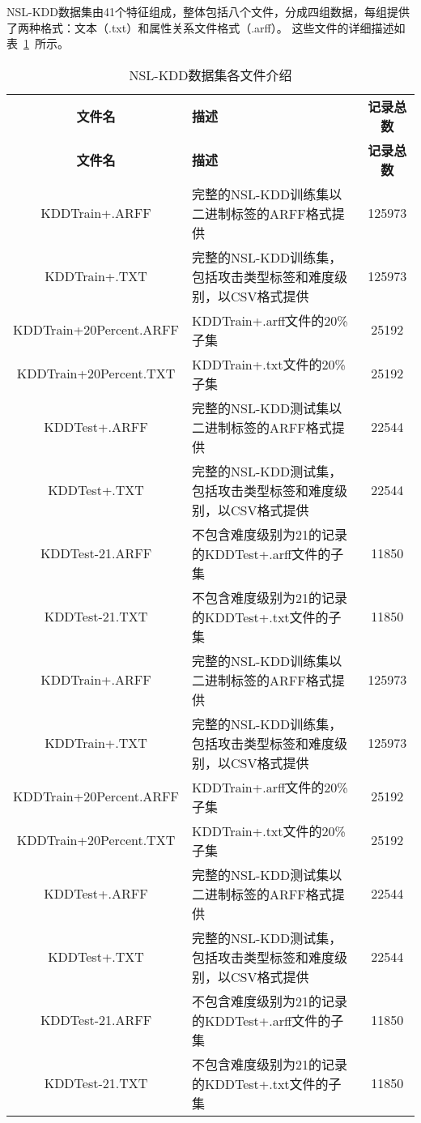NSL-KDD数据集由41个特征组成，整体包括八个文件，分成四组数据，每组提供了两种格式：文本（.txt）和属性关系文件格式（.arff）。
这些文件的详细描述如表~\ref{tab:NSLKDDFile}~所示。
\begin{table}[htbp]
	\caption{NSL-KDD数据集各文件介绍}
	\label{tab:NSLKDDFile}
	\begin{tabularx}{\textwidth}{cXc}
		\toprule
		\textbf{文件名}         & \textbf{描述}                                                  & \textbf{记录总数} \\
		\textbf{文件名}         & \textbf{描述}                                                  & \textbf{记录总数} \\
		\midrule
		KDDTrain+.ARFF          & 完整的NSL-KDD训练集以二进制标签的ARFF格式提供                  & 125973            \\
		KDDTrain+.TXT           & 完整的NSL-KDD训练集，包括攻击类型标签和难度级别，以CSV格式提供 & 125973            \\
		KDDTrain+20Percent.ARFF & KDDTrain+.arff文件的20\%子集                                   & 25192             \\
		KDDTrain+20Percent.TXT  & KDDTrain+.txt文件的20\%子集                                    & 25192             \\
		KDDTest+.ARFF           & 完整的NSL-KDD测试集以二进制标签的ARFF格式提供                  & 22544             \\
		KDDTest+.TXT            & 完整的NSL-KDD测试集，包括攻击类型标签和难度级别，以CSV格式提供 & 22544             \\
		KDDTest-21.ARFF         & 不包含难度级别为21的记录的KDDTest+.arff文件的子集              & 11850             \\
		KDDTest-21.TXT          & 不包含难度级别为21的记录的KDDTest+.txt文件的子集               & 11850             \\
		KDDTrain+.ARFF          & 完整的NSL-KDD训练集以二进制标签的ARFF格式提供                  & 125973            \\
		KDDTrain+.TXT           & 完整的NSL-KDD训练集，包括攻击类型标签和难度级别，以CSV格式提供 & 125973            \\
		KDDTrain+20Percent.ARFF & KDDTrain+.arff文件的20\%子集                                   & 25192             \\
		KDDTrain+20Percent.TXT  & KDDTrain+.txt文件的20\%子集                                    & 25192             \\
		KDDTest+.ARFF           & 完整的NSL-KDD测试集以二进制标签的ARFF格式提供                  & 22544             \\
		KDDTest+.TXT            & 完整的NSL-KDD测试集，包括攻击类型标签和难度级别，以CSV格式提供 & 22544             \\
		KDDTest-21.ARFF         & 不包含难度级别为21的记录的KDDTest+.arff文件的子集              & 11850             \\
		KDDTest-21.TXT          & 不包含难度级别为21的记录的KDDTest+.txt文件的子集               & 11850             \\
		\bottomrule
	\end{tabularx}
\end{table}
